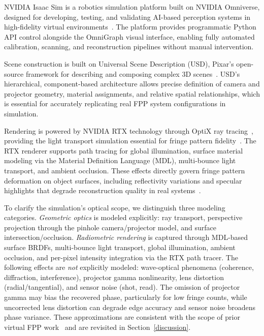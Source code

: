 \documentclass[journal,twoside,web]{ieeecolor}
\begin{document}
NVIDIA Isaac Sim is a robotics simulation platform built on NVIDIA Omniverse, designed
for developing, testing, and validating AI-based perception systems in high-fidelity
virtual environments~\cite{isaacsim_docs}.
The platform provides programmatic Python API control alongside the OmniGraph visual
interface, enabling fully automated calibration, scanning, and reconstruction pipelines
without manual intervention.

Scene construction is built on Universal Scene Description (USD), Pixar's open-source
framework for describing and composing complex 3D scenes~\cite{usd_docs}.
USD's hierarchical, component-based architecture allows precise definition of camera and
projector geometry, material assignments, and relative spatial relationships, which is
essential for accurately replicating real FPP system configurations in simulation.

Rendering is powered by NVIDIA RTX technology through OptiX ray tracing~\cite{parker2010optix},
providing the light transport simulation essential for fringe pattern
fidelity~\cite{bai2024close,haroon2024autonomous}.
The RTX renderer supports path tracing for global illumination, surface material modeling
via the Material Definition Language (MDL), multi-bounce light transport, and ambient
occlusion.
These effects directly govern fringe pattern deformation on object surfaces, including
reflectivity variations and specular highlights that degrade reconstruction quality in
real systems~\cite{feng2018high,wei2014experimental}.

To clarify the simulation's optical scope, we distinguish three modeling categories. \textit{Geometric optics} is modeled explicitly: ray transport, perspective projection through the pinhole camera/projector model, and surface intersection/occlusion. \textit{Radiometric rendering} is captured through MDL-based surface BRDFs, multi-bounce light transport, global illumination, ambient occlusion, and per-pixel intensity integration via the RTX path tracer. The following effects are \textit{not} explicitly modeled: wave-optical phenomena (coherence, diffraction, interference), projector gamma nonlinearity, lens distortion (radial/tangential), and sensor noise (shot, read). The omission of projector gamma may bias the recovered phase, particularly for low fringe counts, while uncorrected lens distortion can degrade edge accuracy and sensor noise broadens phase variance. These approximations are consistent with the scope of prior virtual FPP work~\cite{zheng2020fringe,ueda2021fringe,zhang2023measurement} and are revisited in Section~\ref{discussion}.
\end{document}
